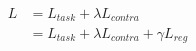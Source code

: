 \begin{align}
L &= L_{task} + \lambda L_{contra} \\
 &= L_{task} + \lambda L_{contra} + \gamma L_{reg}
\label{eq:align}
\end{align}

